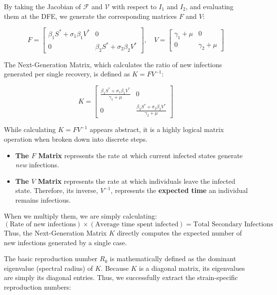 \documentclass[12pt]{article}
\begin{document}
By taking the Jacobian of $\mathcal{F}$ and $\mathcal{V}$ with respect to $I_1$ and $I_2$, and evaluating them at the DFE, we generate the corresponding matrices $F$ and $V$:

\begin{equation}
F = \begin{bmatrix}
\beta_1 S^* + \sigma_1 \beta_1 V^* & 0 \\
0 & \beta_2 S^* + \sigma_2 \beta_2 V^*
\end{bmatrix}, \quad
V = \begin{bmatrix}
\gamma_1 + \mu & 0 \\
0 & \gamma_2 + \mu
\end{bmatrix}
\end{equation}

The Next-Generation Matrix, which calculates the ratio of new infections generated per single recovery, is defined as $K = F V^{-1}$:

\begin{equation}
K = \begin{bmatrix}
\frac{\beta_1 S^* + \sigma_1 \beta_1 V^*}{\gamma_1 + \mu} & 0 \\
0 & \frac{\beta_2 S^* + \sigma_2 \beta_2 V^*}{\gamma_2 + \mu}
\end{bmatrix}
\end{equation}

While calculating $K = F V^{-1}$ appears abstract, it is a highly logical matrix operation when broken down into discrete steps. 
\begin{itemize}
    \item \textbf{The $F$ Matrix} represents the rate at which current infected states generate \textit{new} infections.
    \item \textbf{The $V$ Matrix} represents the rate at which individuals leave the infected state. Therefore, its inverse, $V^{-1}$, represents the \textbf{expected time} an individual remains infectious.
\end{itemize}
When we multiply them, we are simply calculating:
\begin{equation*}
(\text{Rate of new infections}) \times (\text{Average time spent infected}) = \text{Total Secondary Infections}
\end{equation*}
Thus, the Next-Generation Matrix $K$ directly computes the expected number of new infections generated by a single case.

The basic reproduction number $R_0$ is mathematically defined as the dominant eigenvalue (spectral radius) of $K$. Because $K$ is a diagonal matrix, its eigenvalues are simply its diagonal entries. Thus, we successfully extract the strain-specific reproduction numbers:
\end{document}

